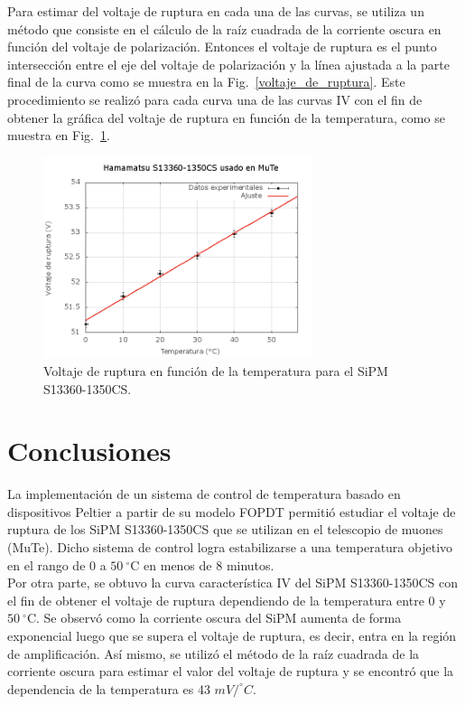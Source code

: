 \documentclass[runningheads]{llncs}
\begin{document}
Para estimar del voltaje de ruptura en cada una de las curvas, se utiliza un método que consiste en el cálculo de la raíz cuadrada de la corriente oscura en función del voltaje de polarización. Entonces el voltaje de ruptura es el punto intersección entre el eje del voltaje de polarización y la línea ajustada a la parte final de la curva como se muestra en la Fig.~\ref{voltaje_de_ruptura}. Este procedimiento se realizó para cada curva una de las curvas IV con el fin de obtener la gráfica del voltaje de ruptura en función de la temperatura, como se muestra en Fig.~\ref{voltaje_ruptura_vs_T}.\\


\begin{figure}[ht!]
\includegraphics[width=0.7\textwidth]{voltajeRuptura.png}
\centering
\caption{Voltaje de ruptura en función de la temperatura para el SiPM S13360-1350CS.} 
\label{voltaje_ruptura_vs_T}
\end{figure}

\section{Conclusiones}
La implementación de un sistema de control de temperatura basado en dispositivos Peltier a partir de su modelo FOPDT permitió estudiar el voltaje de ruptura de los  SiPM S13360-1350CS que se utilizan en el telescopio de muones (MuTe). Dicho sistema de control logra estabilizarse a una temperatura objetivo en el rango de 0  a $50~^\circ$C en menos de 8 minutos.\\

Por otra parte, se obtuvo la curva característica IV del SiPM S13360-1350CS con el fin de obtener el voltaje de ruptura dependiendo de la temperatura entre 0 y $50~^\circ$C. Se observó como la corriente oscura del SiPM aumenta de forma exponencial luego que se supera el voltaje de ruptura, es decir, entra en la región de amplificación. Así mismo, se utilizó el método de la raíz cuadrada de la corriente oscura para estimar el valor del voltaje de ruptura y se encontró que la dependencia de la temperatura es 43 $mV/^\circ C$.\\
\end{document}
